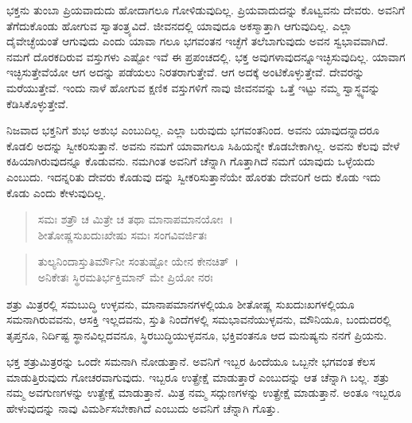 ಭಕ್ತನು ತುಂಬಾ ಪ್ರಿಯವಾದುದು ಹೋದಾಗಲೂ ಗೋಳಿಡುವುದಿಲ್ಲ. ಪ್ರಿಯವಾದುದನ್ನು ಕೊಟ್ವವನು ದೇವರು. ಅವನಿಗೆ ತೆಗೆದುಕೊಂಡು ಹೋಗುವ ಸ್ವಾತಂತ್ರ್ಯವಿದೆ. ಜೀವನದಲ್ಲಿ ಯಾವುದೂ ಅಕಸ್ಮಾತ್ತಾಗಿ ಆಗುವುದಿಲ್ಲ. ಎಲ್ಲಾ ದೈವೇಚ್ಛೆಯಂತೆ ಆಗುವುದು ಎಂದು ಯಾವಾ ಗಲೂ ಭಗವಂತನ ಇಚ್ಛೆಗೆ ತಲೆಬಾಗುವುದು ಅವನ ಸ್ವಭಾವವಾಗಿದೆ. ನಮಗೆ ದೊರಕದಿರುವ ವಸ್ತುಗಳು ಎಷ್ಟೋ ಇವೆ ಈ ಪ್ರಪಂಚದಲ್ಲಿ. ಭಕ್ತ ಅವುಗಳಾವುದನ್ನೂಇಚ್ಛಿಸುವುದಿಲ್ಲ. ಯಾವಾಗ ಇಚ್ಛಿಸುತ್ತೇವೆಯೋ ಆಗ ಅದನ್ನು ಪಡೆಯಲು ನಿರತರಾಗುತ್ತೇವೆ. ಆಗ ಅದಕ್ಕೆ ಅಂಟಿಕೊಳ್ಳುತ್ತೇವೆ. ದೇವರನ್ನು ಮರೆಯುತ್ತೇವೆ. ಇಂದು ನಾಳೆ ಹೋಗುವ ಕ್ಷಣಿಕ ವಸ್ತುಗಳಿಗೆ ನಾವು ಜೀವನವನ್ನು ಒತ್ತೆ ಇಟ್ಟು ನಮ್ಮ ಸ್ವಾಸ್ಥ್ಯವನ್ನು ಕೆಡಿಸಿಕೊಳ್ಳುತ್ತೇವೆ.

ನಿಜವಾದ ಭಕ್ತನಿಗೆ ಶುಭ ಅಶುಭ ಎಂಬುದಿಲ್ಲ. ಎಲ್ಲಾ ಬರುವುದು ಭಗವಂತನಿಂದ. ಅವನು ಯಾವುದನ್ನಾದರೂ ಕೊಡಲಿ ಅದನ್ನು ಸ್ವೀಕರಿಸುತ್ತಾನೆ. ಅವನು ನಮಗೆ ಯಾವಾಗಲೂ ಸಿಹಿಯನ್ನೇ ಕೊಡಬೇಕಾಗಿಲ್ಲ. ಅವನು ಕೆಲವು ವೇಳೆ ಕಹಿಯಾಗಿರುವುದನ್ನೂ ಕೊಡುವನು. ನಮಗಿಂತ ಅವನಿಗೆ ಚೆನ್ನಾಗಿ ಗೊತ್ತಾಗಿದೆ ನಮಗೆ ಯಾವುದು ಒಳ್ಳೆಯದು ಎಂಬುದು. ಇದನ್ನರಿತು ದೇವರು ಕೊಡುವು ದನ್ನು ಸ್ವೀಕರಿಸುತ್ತಾನೆಯೇ ಹೊರತು ದೇವರಿಗೆ ಅದು ಕೊಡು ಇದು ಕೊಡು ಎಂದು ಕೇಳುವುದಿಲ್ಲ.

\begin{verse}
ಸಮಃ ಶತ್ರೌ ಚ ಮಿತ್ರೇ ಚ ತಥಾ ಮಾನಾಪಮಾನಯೋಃ~।\\ಶೀತೋಷ್ಣಸುಖದುಃಖೇಷು ಸಮಃ ಸಂಗವಿವರ್ಜಿತಃ 
\end{verse}

\begin{verse}
ತುಲ್ಯನಿಂದಾಸ್ತುತಿರ್ಮೌನೀ ಸಂತುಷ್ಟೋ ಯೇನ ಕೇನಚಿತ್~।\\ಅನಿಕೇತಃ ಸ್ಥಿರಮತಿರ್ಭಕ್ತಿಮಾನ್ ಮೇ ಪ್ರಿಯೋ ನರಃ 
\end{verse}

{\small ಶತ್ರು ಮಿತ್ರರಲ್ಲಿ ಸಮಬುದ್ಧಿ ಉಳ್ಳವನು, ಮಾನಾಪಮಾನಗಳಲ್ಲಿಯೂ ಶೀತೋಷ್ಣ ಸುಖದುಃಖಗಳಲ್ಲಿಯೂ ಸಮನಾಗಿರುವವನು, ಆಸಕ್ತಿ ಇಲ್ಲದವನು, ಸ್ತುತಿ ನಿಂದೆಗಳಲ್ಲಿ ಸಮಭಾವನೆಯುಳ್ಳವನು, ಮೌನಿಯೂ, ಬಂದುದರಲ್ಲಿ ತೃಪ್ತನೂ, ನಿರ್ದಿಷ್ಟ ಸ್ಥಾನವಿಲ್ಲದವನೂ, ಸ್ಥಿರಬುದ್ಧಿಯುಳ್ಳವನೂ, ಭಕ್ತಿವಂತನೂ ಆದ ಮನುಷ್ಯನು ನನಗೆ ಪ್ರಿಯನು.}

ಭಕ್ತ ಶತ್ರುಮಿತ್ರರನ್ನು ಒಂದೇ ಸಮನಾಗಿ ನೋಡುತ್ತಾನೆ. ಅವನಿಗೆ ಇಬ್ಬರ ಹಿಂದೆಯೂ ಒಬ್ಬನೇ ಭಗವಂತ ಕೆಲಸ ಮಾಡುತ್ತಿರುವುದು ಗೋಚರವಾಗುವುದು. ಇಬ್ಬರೂ ಉತ್ಪ್ರೇಕ್ಷೆ ಮಾಡುತ್ತಾರೆ ಎಂಬುದನ್ನು ಆತ ಚೆನ್ನಾಗಿ ಬಲ್ಲ. ಶತ್ರು ನಮ್ಮ ಅವಗುಣಗಳನ್ನು ಉತ್ಪ್ರೇಕ್ಷೆ ಮಾಡುತ್ತಾನೆ. ಮಿತ್ರ ನಮ್ಮ ಸದ್ಗುಣಗಳನ್ನು ಉತ್ಪ್ರೇಕ್ಷೆ ಮಾಡುತ್ತಾನೆ. ಅಂತೂ ಇಬ್ಬರೂ ಹೇಳುವುದನ್ನು ನಾವು ವಿಮರ್ಶಿಸಬೇಕಾಗಿದೆ ಎಂಬುದು ಅವನಿಗೆ ಚೆನ್ನಾಗಿ ಗೊತ್ತು.

